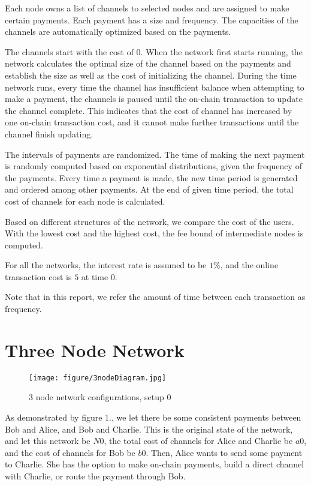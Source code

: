 \documentclass[twocolumn,10pt]{report}
\begin{document}
Each node owns a list of channels to selected nodes and are assigned to make certain payments. Each payment has a size and frequency. The capacities of the channels are automatically optimized based on the payments.

The channels start with the cost of 0. When the network first starts running, the network calculates the optimal size of the channel based on the payments and establish the size as well as the cost of initializing the channel. During the time network runs, every time the channel has insufficient balance when attempting to make a payment, the channels is paused until the on-chain transaction to update the channel complete. This indicates that the cost of channel has increased by one on-chain transaction cost, and it cannot make further transactions until the channel finish updating. 

The intervals of payments are randomized. The time of making the next payment is randomly computed based on exponential distributions, given the frequency of the payments. Every time a payment is made, the new time period is generated and ordered among other payments. At the end of given time period, the total cost of channels for each node is calculated.

Based on different structures of the network, we compare the cost of the users.
With the lowest cost and the highest cost, the fee bound of intermediate nodes is computed. 

For all the networks, the interest rate is assumed to be $1\%$, and the online transaction cost is $5$ at time $0$. 

Note that in this report, we refer the amount of time between each transaction as frequency.


\section{Three Node Network}
\begin{figure}[t]
    \begin{center}
    \setlength{\unitlength}{0.012500in}
    \texttt{[image: figure/3nodeDiagram.jpg]}
    \end{center}
    \caption{3 node network configurations, setup 0}
    \label{figure_3Node1} 
\end{figure}
As demonstrated by figure 1., we let there be some consistent payments between Bob and Alice, and Bob and Charlie. This is the original state of the network, and let this network be $N0$, the total cost of channels for Alice and Charlie be $a0$, and the cost of channels for Bob be $b0$. Then, Alice wants to send some payment to Charlie. She has the option to make on-chain payments, build a direct channel with Charlie, or route the payment through Bob. 
\end{document}
